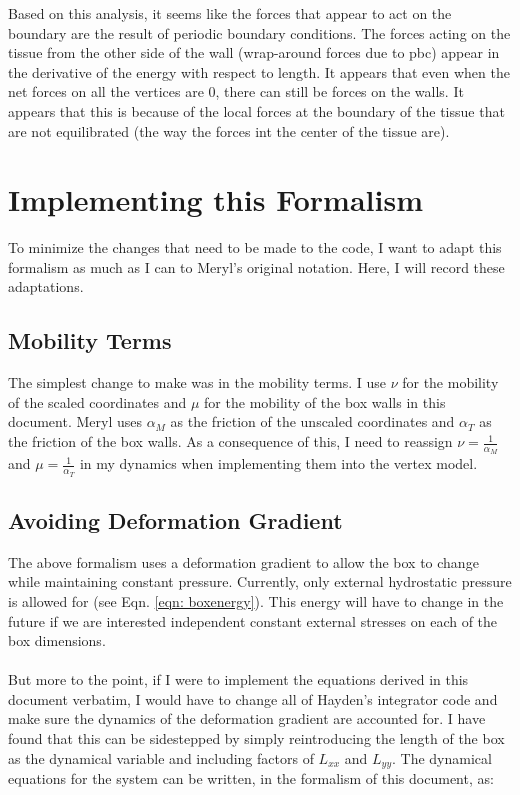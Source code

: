\documentclass[12pt]{article}
\begin{document}
Based on this analysis, it seems like the forces that appear to act on the boundary are the result of periodic boundary conditions. The forces acting on the tissue from the other side of the wall (wrap-around forces due to pbc) appear in the derivative of the energy with respect to length. It appears that even when the net forces on all the vertices are $0$, there can still be forces on the walls. It appears that this is because of the local forces at the boundary of the tissue that are not equilibrated (the way the forces int the center of the tissue are). 


\section{Implementing this Formalism}

To minimize the changes that need to be made to the code, I want to adapt this formalism as much as I can to Meryl's original notation. Here, I will record these adaptations.

\subsection{Mobility Terms}
The simplest change to make was in the mobility terms. I use $\nu$ for the mobility of the scaled coordinates and $\mu$ for the mobility of the box walls in this document. Meryl uses $\alpha_M$ as the friction of the unscaled coordinates and $\alpha_T$ as the friction of the box walls. As a consequence of this, I need to reassign $\nu = \frac{1}{\alpha_M}$ and $\mu = \frac{1}{\alpha_T}$ in my dynamics when implementing them into the vertex model. 
\subsection{Avoiding Deformation Gradient}
The above formalism uses a deformation gradient to allow the box to change while maintaining constant pressure. Currently, only external hydrostatic pressure is allowed for (see Eqn.  \ref{eqn: boxenergy}). This energy will have to change in the future if we are interested independent constant external stresses on each of the box dimensions. \\ \\
But more to the point, if I were to implement the equations derived in this document verbatim, I would have to change all of Hayden's integrator code and make sure the dynamics of the deformation gradient are accounted for. I have found that this can be sidestepped by simply reintroducing the length of the box as the dynamical variable and including factors of $L_{xx}$ and $L_{yy}$. The dynamical equations for the system can be written, in the formalism of this document, as:
\end{document}
